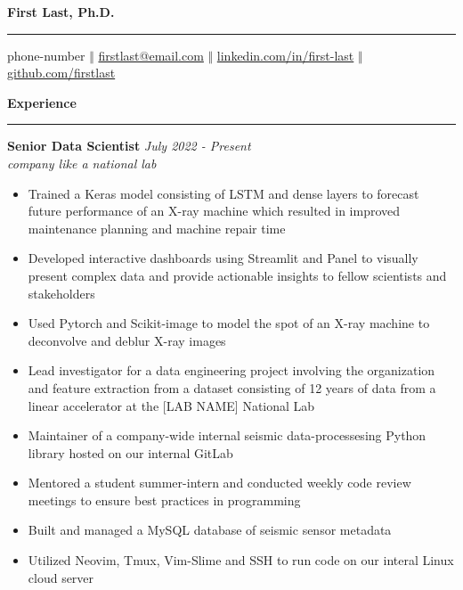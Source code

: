 \documentclass[11pt]{article}
\begin{document}
\thispagestyle{empty}

\begin{center}
  \bf \Huge  First Last, Ph.D.
  \vspace{.1em}
  \hrule
\end{center}

\begin{center}
  \vspace{.4em}
  phone-number $\Big \Vert$
  \href{firstlast@email.com}{firstlast@email.com} $\Big \Vert$ 
  \href{linkedin.com/in/first-last}{linkedin.com/in/first-last} $\Big \Vert$
  \href{github.com/firstlast}{github.com/firstlast}
\end{center}

\textbf{\Large Experience}
\vspace{.3em}
\hrule
\vspace{.3em}

\textbf{\large Senior Data Scientist} \hfill \textit{July 2022 - Present}\\
\textit{company like a national lab} 

\begin{itemize} \setlength\itemsep{-0.5em}
  \item Trained a Keras model consisting of LSTM and dense layers to forecast
  future performance of an X-ray machine which resulted in improved maintenance
  planning and machine repair time
  \item Developed interactive dashboards using Streamlit and Panel to
  visually present complex data and provide actionable insights to
  fellow scientists and stakeholders
  \item Used Pytorch and Scikit-image to model the spot of an
  X-ray machine to deconvolve and deblur X-ray images
  \item Lead investigator for a data engineering project involving
  the organization and feature extraction from a dataset consisting of
  12 years of data from a linear accelerator at the  [LAB NAME] National Lab
  \item Maintainer of a company-wide internal seismic data-processesing Python library
  hosted on our internal GitLab
  \item Mentored a student summer-intern and conducted weekly code review meetings
  to ensure best practices in programming
  \item Built and managed a MySQL database of seismic sensor metadata
  \item Utilized Neovim, Tmux, Vim-Slime and SSH to
  run code on our interal Linux cloud server
\end{itemize}
\end{document}
